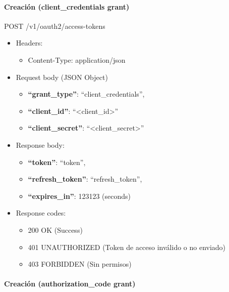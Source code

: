 \documentclass[12pt,a4paperpaper,]{report}
\providecommand{\tightlist}{%
  \setlength{\itemsep}{0pt}\setlength{\parskip}{0pt}}
\let\oldparagraph\paragraph
\renewcommand{\paragraph}[1]{\oldparagraph{#1}\mbox{}}
\begin{document}
\paragraph{Creación (client\_credentials
grant)}\label{creaciuxf3n-client_credentials-grant}

POST /v1/oauth2/access-tokens

\begin{itemize}
\tightlist
\item
  Headers:

  \begin{itemize}
  \tightlist
  \item
    Content-Type: application/json
  \end{itemize}
\item
  Request body (JSON Object)

  \begin{itemize}
  \tightlist
  \item
    \textbf{``grant\_type''}: ``client\_credentials'',
  \item
    \textbf{``client\_id''}: ``\textless{}client\_id\textgreater{}''
  \item
    \textbf{``client\_secret''}:
    ``\textless{}client\_secret\textgreater{}''
  \end{itemize}
\item
  Response body:

  \begin{itemize}
  \tightlist
  \item
    \textbf{``token''}: ``token'',
  \item
    \textbf{``refresh\_token''}: ``refresh\_token'',
  \item
    \textbf{``expires\_in''}: 123123 (seconds)
  \end{itemize}
\item
  Response codes:

  \begin{itemize}
  \tightlist
  \item
    200 OK (Success)
  \item
    401 UNAUTHORIZED (Token de acceso inválido o no enviado)
  \item
    403 FORBIDDEN (Sin permisos)
  \end{itemize}
\end{itemize}

\paragraph{Creación (authorization\_code
grant)}\label{creaciuxf3n-authorization_code-grant}
\end{document}
